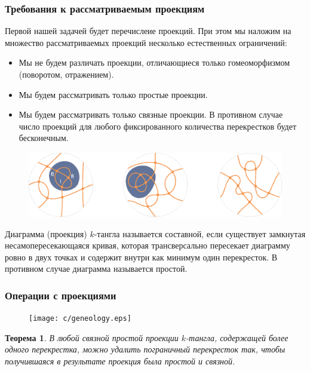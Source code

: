 \documentclass[dvips, intlimits, 9pt, unicode, notheorems, color=usenames,dvipsnames]{beamer}
\theoremstyle{plain}
\newtheorem{theorem}{Теорема}
\theoremstyle{definition}
\begin{document}
	\begin{frame}
		\frametitle{Требования к рассматриваемым проекциям}

		Первой нашей задачей будет перечислеие проекций. При этом мы наложим на множество рассматриваемых проекций
		несколько естественных ограничений:
		\begin{itemize}
			\item Мы не будем различать проекции, отличающиеся только гомеоморфизмом (поворотом, отражением).
			\item Мы будем рассматривать только простые проекции.
			\item Мы будем рассматривать только связные проекции. В противном случае число проекций для любого фиксированного
			количества перекрестков будет бесконечным.
		\end{itemize}

		\begin{figure}
			\centering
			\includegraphics[scale = 0.5]{c/composite-non-connected-projections.eps}
		\end{figure}

		Диаграмма (проекция) $k$-тангла называется составной, если существует замкнутая несамопересекающаяся кривая, которая трансверсально
		пересекает диаграмму ровно в двух точках и содержит внутри как минимум один перекресток. В противном случае диаграмма называется простой.
	\end{frame}

	\begin{frame}
		\frametitle{Операции с проекциями}

		\begin{figure}[ht]
			\centering
			\texttt{[image: c/geneology.eps]}
		\end{figure}

		\begin{theorem}
			В любой связной простой проекции $k$-тангла, содержащей более одного перекрестка, можно удалить пограничный
			перекресток так, чтобы получившаяся в результате проекция была простой и связной.
		\end{theorem}
	\end{frame}
\end{document}
